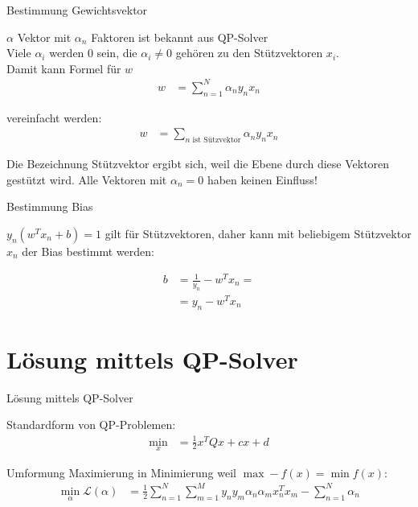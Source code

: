 \documentclass[ngerman]{beamer}
\newcommand{\Lagr}{\mathcal{L}}
\begin{document}
\begin{frame}{Bestimmung Gewichtsvektor}
	
	$\alpha$ Vektor mit $\alpha_{n}$ Faktoren ist bekannt aus QP-Solver\\
	Viele $\alpha_{i}$ werden $0$ sein, die $\alpha_{i} \neq 0$ gehören zu den Stützvektoren $x_{i}$. \\
	Damit kann Formel für $w$
	\begin{equation*}
		\begin{aligned}
			w &= \sum_{n=1}^{N} \alpha_{n} y_{n} x_{n}
		\end{aligned}
	\end{equation*}

	vereinfacht werden:
	\begin{equation*}
	\begin{aligned}
		w &= \sum_{n \text{ ist Sützvektor}} \alpha_{n} y_{n} x_{n}
	\end{aligned}
	\end{equation*}

	Die Bezeichnung Stützvektor ergibt sich, weil die Ebene durch diese Vektoren \glqq gestützt \grqq wird. Alle Vektoren mit $\alpha_{n} = 0$ haben keinen Einfluss!
\end{frame}

\begin{frame}{Bestimmung Bias}
	
	$y_n (w^{T} x_{n} + b) = 1$ gilt für Stützvektoren, daher kann mit beliebigem Stützvektor $x_{n}$ der Bias bestimmt werden:
	
	\begin{equation*}
		\begin{aligned}
			b &= \frac{1}{y_{n}} - w^{T} x_{n} = \\
			&= y_{n} - w^{T} x_{n} 
		\end{aligned}
	\end{equation*}
	
	
\end{frame}


\section{Lösung mittels QP-Solver}

\begin{frame}{Lösung mittels QP-Solver}
	
	Standardform von QP-Problemen:
	\begin{equation*} \label{std_QP_problem}
		\begin{aligned}
			\min_{x} &= \frac{1}{2} x^{T} Q x + c x + d 
		\end{aligned}
	\end{equation*}
	
	Umformung Maximierung in Minimierung weil $\max -f(x) = \min f(x)$:
	\begin{equation*} \label{qp_adapt1}
		\begin{aligned}
			\min_{\alpha} \Lagr(\alpha) &= \frac{1}{2} \sum_{n=1}^{N} \sum_{m=1}^{M} y_{n} y_{m} \alpha_{n} \alpha_{m} x_{n}^{T} x_{m} - \sum_{n=1}^{N} \alpha_{n}
		\end{aligned}
	\end{equation*}
\end{frame}
\end{document}
